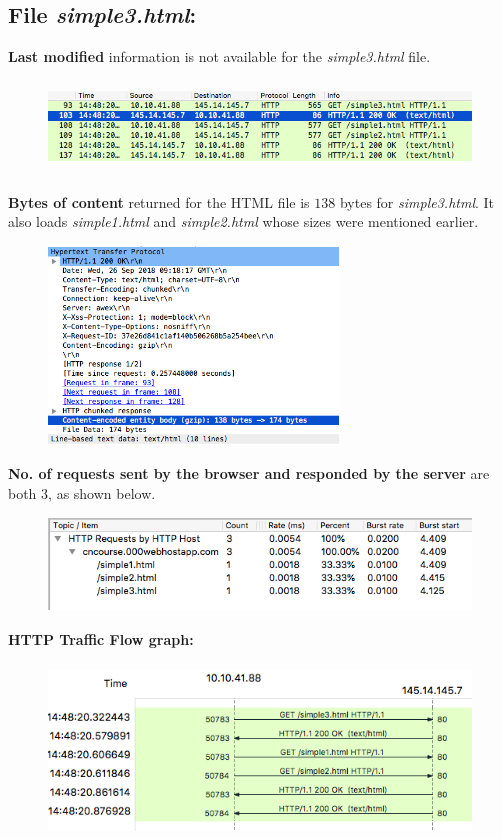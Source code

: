 \documentclass[]{report}
\begin{document}
\subsection{File \textit{simple3.html}:}
\textbf{Last modified} information is not available for the \textit{simple3.html} file.
\begin{figure}[H]
	\vspace{0pt}
	\includegraphics[height = 70pt, keepaspectratio]{Snapshots/q1/simple3/1_III.png}
\end{figure}
\textbf{Bytes of content} returned for the HTML file is $138$ bytes for \textit{simple3.html}. It also loads \textit{simple1.html} and \textit{simple2.html} whose sizes were mentioned earlier. 
\begin{figure}[H]
	\vspace{0pt}
	\includegraphics[height = 150pt, keepaspectratio]{Snapshots/q1/simple3/1_3_6.png}
\end{figure}
\textbf{No. of requests sent by the browser and responded by the server} are both $3$, as shown below. 
\begin{figure}[H]
	\vspace{0pt}
	\includegraphics[height = 70pt, keepaspectratio]{Snapshots/q1/simple3/1_3_8.png}
\end{figure}
\textbf{HTTP Traffic Flow graph:}
\begin{figure}[H]
	\vspace{0pt}
	\includegraphics[height = 130pt, keepaspectratio]{Snapshots/q1/simple3/1_3_9.png}
\end{figure}
\end{document}
